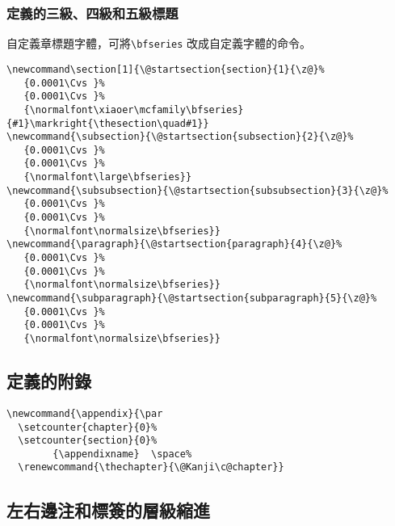\subsubsection{定義的三級、四級和五級標題}

\par%
自定義章標題字體，可將\verb+\bfseries+ 改成自定義字體的命令。
\begin{lstlisting}[firstnumber=1062]
\newcommand\section[1]{\@startsection{section}{1}{\z@}%
   {0.0001\Cvs }%
   {0.0001\Cvs }%
   {\normalfont\xiaoer\mcfamily\bfseries}{#1}\markright{\thesection\quad#1}}
\newcommand{\subsection}{\@startsection{subsection}{2}{\z@}%
   {0.0001\Cvs }%
   {0.0001\Cvs }%
   {\normalfont\large\bfseries}}
\newcommand{\subsubsection}{\@startsection{subsubsection}{3}{\z@}%
   {0.0001\Cvs }%
   {0.0001\Cvs }%
   {\normalfont\normalsize\bfseries}}
\newcommand{\paragraph}{\@startsection{paragraph}{4}{\z@}%
   {0.0001\Cvs }%
   {0.0001\Cvs }%
   {\normalfont\normalsize\bfseries}}
\newcommand{\subparagraph}{\@startsection{subparagraph}{5}{\z@}%
   {0.0001\Cvs }%
   {0.0001\Cvs }%
   {\normalfont\normalsize\bfseries}}
\end{lstlisting}

\subsection{定義的附錄}

\begin{lstlisting}[firstnumber=1083]
\newcommand{\appendix}{\par
  \setcounter{chapter}{0}%
  \setcounter{section}{0}%
        {\appendixname}  \space%
  \renewcommand{\thechapter}{\@Kanji\c@chapter}}
\end{lstlisting}

\subsection{左右邊注和標簽的層級縮進}

